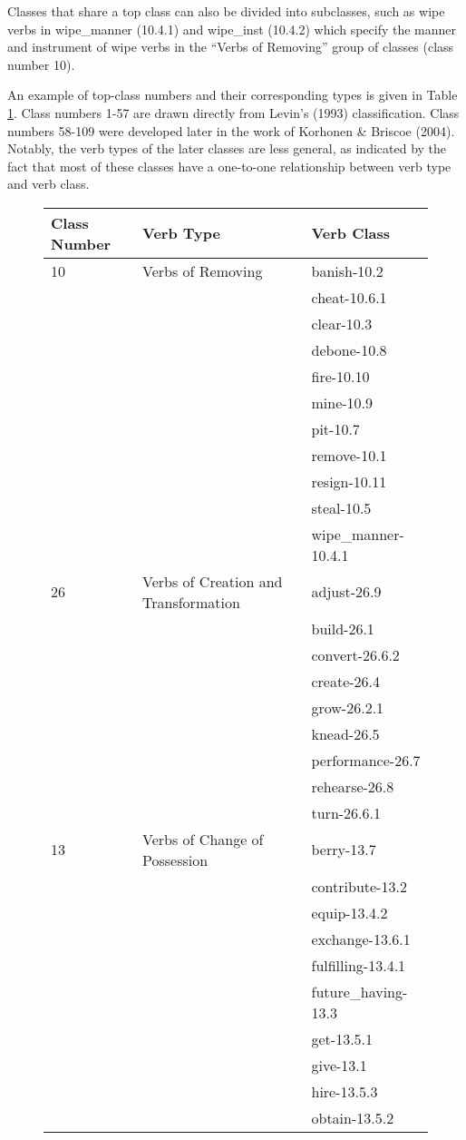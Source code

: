 Classes that share a top class can also be divided into subclasses, such as wipe verbs in wipe\_manner (10.4.1) and wipe\_inst (10.4.2) which specify the manner and instrument of wipe verbs in the \enquote{Verbs of Removing} group of classes (class number 10). 

An example of top-class numbers and their corresponding types is given in Table \ref{tb:vtype_example}. Class numbers 1-57 are drawn directly from Levin's (1993) classification. Class numbers 58-109 were developed later in the work of Korhonen \& Briscoe (2004). Notably, the verb types of the later classes are less general, as indicated by the fact that most of these classes have a one-to-one relationship between verb type and verb class.

\begin{figure}[h]
\begingroup
\scriptsize
\centering
\begin{tabularx}{12cm}{l  l  l}
\hline
Class Number	&Verb Type	&Verb Class \\
\hline 
\hline
10&	Verbs of Removing		&banish-10.2 \\
&&cheat-10.6.1\\
&&clear-10.3\\
&&debone-10.8\\
&&fire-10.10\\
&&mine-10.9\\
&&pit-10.7\\
&&remove-10.1\\
&&resign-10.11\\
&&steal-10.5\\
&&wipe\_manner-10.4.1\\
\hline
26	&Verbs of Creation and Transformation	&adjust-26.9 \\
&&build-26.1 \\
&&convert-26.6.2\\
&&create-26.4\\
&&grow-26.2.1\\
&&knead-26.5\\
&&performance-26.7\\
&&rehearse-26.8\\
&&turn-26.6.1\\
\hline
13&	Verbs of Change of Possession	&berry-13.7 \\
&&contribute-13.2\\
&&equip-13.4.2\\
&&exchange-13.6.1\\
&&fulfilling-13.4.1\\
&&future\_having-13.3\\
&&get-13.5.1\\
&&give-13.1\\
&&hire-13.5.3\\
&&obtain-13.5.2\\
\hline
\end{tabularx}

\label{tb:vtype_example}

\endgroup
\end{figure}
